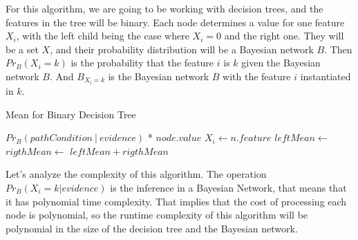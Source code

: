 
For this algorithm, we are going to be working with decision trees, and the features in the tree will be binary. Each node determines a value for one feature $X_i$, with the left child being the case where $X_i=0$ and the right one. They will be a set $X$, and their probability distribution will be a Bayesian network $B$. Then $Pr_B(X_i = k)$ is the probability that the feature $i$ is $k$ given the Bayesian network $B$. And $B_{X_i=k}$ is the Bayesian network $B$ with the feature $i$ instantiated in $k$. 




\begin{algorithm}
\caption{Mean for Binary Decision Tree}
\begin{algorithmic}[1]
        \State \Return  $Pr_B(pathCondition\ | \ evidence)$ * $node.value$
    \EndIf
    \State $X_i \gets n.feature$
    \State $leftMean \gets$  
    \State $rigthMean \gets$  
    \State \Return  \mbox{$leftMean + rigthMean$}
\EndFunction
\end{algorithmic}
\end{algorithm}

Let's analyze the complexity of this algorithm. The operation $Pr_B(X_i = k | evidence)$ is the inference in a Bayesian Network, that means that it has  polynomial time complexity. That implies that the cost of processing each node is polynomial, so the runtime complexity of this algorithm will be polynomial in the size of the decision tree and the Bayesian network. 


